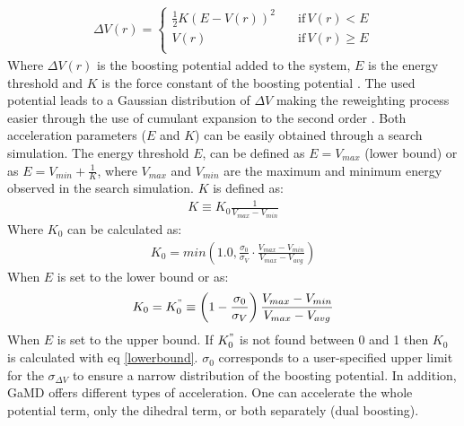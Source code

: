 \begin{equation}
  \begin{aligned}
\Delta V(r) =\begin{cases}
          \frac{1}{2} K \left ( E - V(r) \right )^2 \quad &\text{if} \, V(r) < E \\
          V(r) \quad &\text{if} \, V(r) \geq E \\
     \end{cases}
  \end{aligned}
\end{equation}
Where $\Delta V(r)$ is the boosting potential added to the system, $E$ is the energy threshold and $K$ is the force constant of the boosting potential \cite{miao2015gaussian}. The used potential leads to a Gaussian distribution of $\Delta V$ making the reweighting process easier through the use of cumulant expansion to the second order \cite{miao2014improved}. Both acceleration parameters ($E$ and $K$) can be easily obtained through a search simulation. The energy threshold $E$, can be defined as $E = V_{max}$ (lower bound) or as $E = V_{min} + \frac{1}{K}$, where $V_{max}$ and $V_{min}$ are the maximum and minimum energy observed in the search simulation. $K$ is defined as: 
\begin{equation}
  \begin{aligned}
  K \equiv K_0 \frac{1}{V_{max} - V_{min}}
    \end{aligned}
\end{equation}
Where $K_0$ can be calculated as:
\begin{equation}
\label{lowerbound}
  \begin{aligned}
K_0 = min\left(1.0, \frac{\sigma_0}{\sigma_V} · \frac{V_{max} - V_{min}}{V_{max} - V_{avg}}\right)
    \end{aligned}
\end{equation}
When $E$ is set to the lower bound or as:
\begin{equation}
  \begin{aligned}
K_0 = K_{0}^{"} \equiv \left(1 - \frac{\sigma_0}{\sigma_V}\right)\frac{V_{max} - V_{min}}{V_{max} - V_{avg}}
  \end{aligned}
\end{equation}
When $E$ is set to the upper bound. If $K_{0}^{"}$ is not found between 0 and 1 then $K_0$ is calculated with eq \eqref{lowerbound}. $\sigma_0$ corresponds to a user-specified upper limit for the $\sigma_{\Delta V}$ to ensure a narrow distribution of the boosting potential. In addition, GaMD offers different types of acceleration. One can accelerate the whole potential term, only the dihedral term, or both separately (dual boosting).

